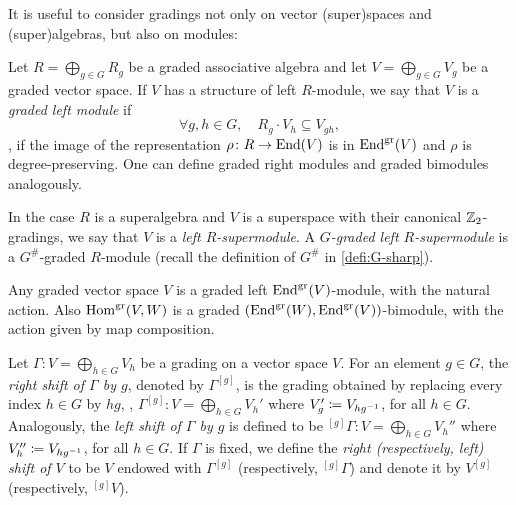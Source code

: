 It is useful to consider gradings not only on vector (super)spaces and (super)algebras, but also on modules:

\begin{defi}\label{defi:grdModule}
    Let $R = \bigoplus_{g\in G} R_g$ be a graded associative algebra and let $V = \bigoplus_{g\in G} V_g$ be a graded vector space. 
    If $V$ has a structure of left $R$-module, we say that $V$ is a \emph{graded left module} if 
    \[
        \forall g,h \in G, \quad R_g \cdot V_h \subseteq V_{gh},
    \]
    \ie, if the image of the representation $\rho\colon R \to \operatorname{End}(V)$ is in $\operatorname{End}^{\textrm{gr}}(V)$ and $\rho$ is degree-preserving. 
    One can define graded right modules and graded bimodules analogously. 
\end{defi}

In the case $R$ is a superalgebra and $V$ is a superspace with their canonical $\mathbb{Z}_2$-gradings, we say that $V$ is a \emph{left $R$-supermodule}. 
A \emph{$G$-graded left $R$-supermodule} is a $G^\#$-graded $R$-module (recall the definition of $G^\#$ in \cref{defi:G-sharp}).

\begin{ex}
    Any graded vector space $V$ is a graded left $\operatorname{End}^{\textrm{gr}}(V)$-module, with the natural action. 
    Also $\operatorname{Hom}^{\textrm{gr}}(V, W)$ is a graded $(\operatorname{End}^{\textrm{gr}}(W),\operatorname{End}^{\textrm{gr}}(V))$-bimodule, with the action given by map composition. 
\end{ex}




\begin{defi}
    Let $\Gamma: V = \bigoplus_{h\in G} V_h$ be a grading on a vector space $V$. 
    For an element $g\in G$, the \emph{right shift of $\Gamma$ by $g$}, denoted by $\Gamma^{[g]}$, is the grading obtained by replacing every index $h \in G$ by $hg$, \ie, $\Gamma^{[g]} : V = \bigoplus_{h\in G} V_h'$ where $V_{g}' \coloneqq V_{hg^{-1}}$, for all $h\in G$. 
    Analogously, the \emph{left shift of $\Gamma$ by $g$} is defined to be ${}^{[g]}\Gamma : V = \bigoplus_{h\in G} V_h''$ where $V_{h}'' \coloneqq V_{hg^{-1}}$, for all $h\in G$. 
    If $\Gamma$ is fixed, we define the \emph{right (respectively, left) shift of $V$} to be $V$ endowed with $\Gamma^{[g]}$ (respectively, ${}^{[g]}\Gamma$) and denote it by $V^{[g]}$ (respectively, ${}^{[g]}V$).
\end{defi}

